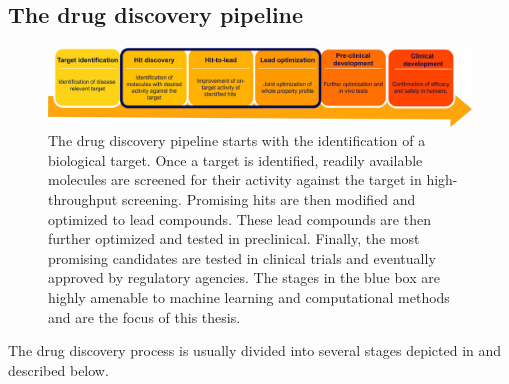 \subsection{The drug discovery pipeline}
\begin{figure}
    \centering
    \includegraphics[width=\textwidth]{figures/drug-discovery-pipeline.pdf}
    \caption{The drug discovery pipeline starts with the identification of a biological target.
        Once a target is identified, readily available molecules are screened for their activity
        against the target in high-throughput screening. Promising hits are then modified and
        optimized to lead compounds. These lead compounds are then further optimized and tested
        in preclinical. Finally, the most promising candidates are tested in clinical trials and
        eventually approved by regulatory agencies. The stages in the blue box are highly
        amenable to machine learning and computational methods and are the focus of this
        thesis.\label{fig:drug-discovery-pipeline}}
\end{figure}
The drug discovery process is usually divided into several stages \citep{todo} depicted in
 and described below.

